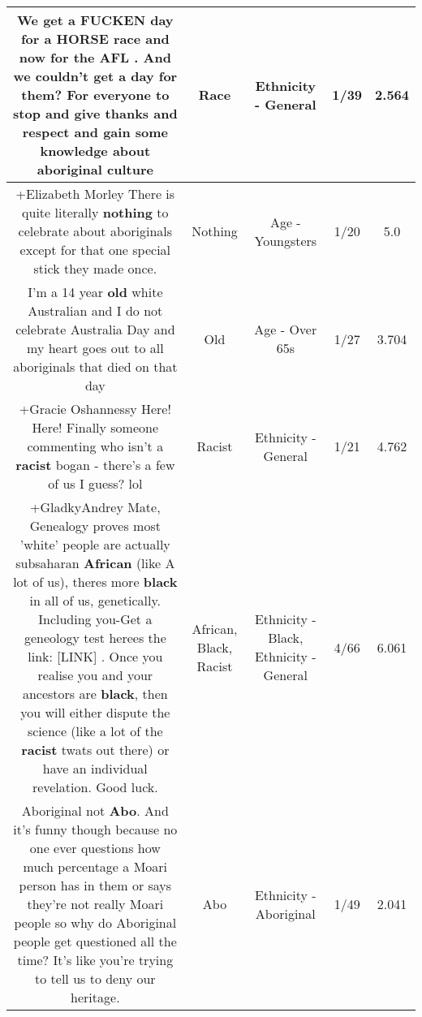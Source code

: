 \documentclass[11pt]{article}
\newlength\mylength
\begin{document}
\begin{center}
\begin{longtable}{|C{.65\mylength}|C{.30\mylength}|C{.12\mylength}|C{.12\mylength}|C{.12\mylength}|}
  \small We get a FUCKEN day for a HORSE \textbf{race} and now for the AFL . And we couldn't get a day for them? For everyone to stop and give thanks and respect and gain some knowledge about aboriginal culture\normalsize   & Race & Ethnicity - General & 1/39 & 2.564 \\  \hline
  \small +Elizabeth Morley There is quite literally \textbf{nothing} to celebrate about aboriginals except for that one special stick they made once.\normalsize   & Nothing & Age - Youngsters & 1/20 & 5.0 \\  \hline
  \small I'm a 14 year \textbf{old} white Australian and I do not celebrate Australia Day and my heart goes out to all aboriginals that died on that day\normalsize   & Old & Age - Over 65s & 1/27 & 3.704 \\  \hline
  \small +Gracie Oshannessy Here! Here! Finally someone commenting who isn't a \textbf{racist} bogan - there's a few of us I guess? lol\normalsize   & Racist & Ethnicity - General & 1/21 & 4.762 \\  \hline
  \small +GladkyAndrey Mate, Genealogy proves most 'white' people are actually subsaharan \textbf{African} (like A lot of us), theres more \textbf{black} in all of us, genetically. Including you-Get a geneology test herees the link:  [LINK]   . Once you realise you and your ancestors are \textbf{black}, then you will either dispute the science (like a lot of the \textbf{racist} twats out there) or have an individual revelation. Good luck.\normalsize   & African, Black, Racist & Ethnicity - Black, Ethnicity - General & 4/66 & 6.061 \\  \hline
  \small *Aboriginal not \textbf{Abo}. And it's funny though because no one ever questions how much percentage a Moari person has in them or says they're not really Moari people so why do Aboriginal people get questioned all the time? It's like you're trying to tell us to deny our heritage.\normalsize   & Abo & Ethnicity - Aboriginal & 1/49 & 2.041 \\  \hline

\end{longtable}
\end{center}
\end{document}
